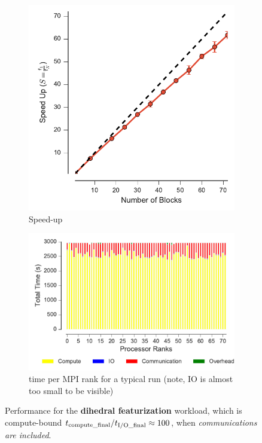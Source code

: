 \begin{figure}[tbp]
\begin{subfigure} {.35\textwidth}
  \centering
  \includegraphics[width=\linewidth]{figs/speed_up-dihedral-comm.pdf}
  \caption{Speed-up}
  \label{fig:MPI-dihedral-comm-speedup}
\end{subfigure}
\hfill
\begin{subfigure} {.5\textwidth}
  \centering
  \includegraphics[width=\linewidth]{figs/BarPlot-rank-comparison-dihedral-comm.pdf}
  \caption{time per MPI rank for a typical run (note, IO is almost too
    small to be visible)}
\end{subfigure}
\caption{Performance for the \textbf{dihedral featurization} workload,
  which is compute-bound ${t}_{\text{compute\_final}}/{t}_{\text{I/O\_final}} \approx 100$, when
  \emph{communications are included}.}
\label{fig:MPI-dihedral-comm}
\end{figure}

